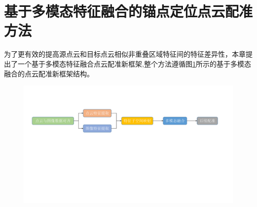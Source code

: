 
    \section{基于多模态特征融合的锚点定位点云配准方法}
    为了更有效的提高源点云和目标点云相似非重叠区域特征间的特征差异性，本章提出了一个基于多模态特征融合点云配准新框架,整个方法遵循图\ref{fig:4-1}所示的基于多模态融合的点云配准新框架结构。

    \vspace{-0.1cm}
    \begin{figure}[h]
        \centering
        \includegraphics[width = \textwidth]{my/figure/4-1.pdf}
        \label{fig:4-1}
    \end{figure}
    \vspace{-0.35cm}

